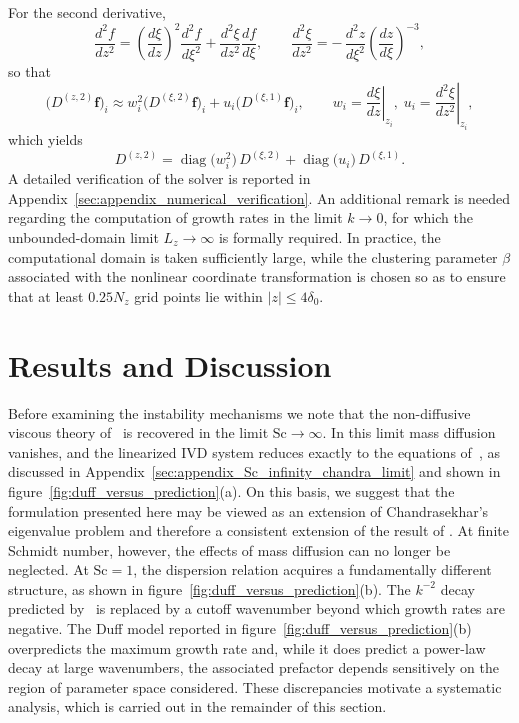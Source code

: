 \documentclass[11pt]{article}
\newcommand{\Sch}{\mathrm{Sc}}
\begin{document}
For the second derivative,
\begin{equation}
    \frac{d^{2}f}{dz^{2}} = \left(\frac{d\xi}{dz}\right)^{2}\frac{d^{2}f}{d\xi^{2}} + \frac{d^{2}\xi}{dz^{2}}\frac{df}{d\xi}, \qquad
    \frac{d^{2}\xi}{dz^{2}} = -\,\frac{d^{2}z}{d\xi^{2}}\left(\frac{dz}{d\xi}\right)^{-3},
\end{equation}
so that
\begin{equation}
    \bigl(D^{(z,2)}\mathbf{f}\bigr)_{i} \approx w_{i}^{2}\bigl(D^{(\xi,2)}\mathbf{f}\bigr)_{i} + u_{i}\bigl(D^{(\xi,1)}\mathbf{f}\bigr)_{i}, \qquad
    w_{i} = \left.\frac{d\xi}{dz}\right|_{z_{i}}, \; u_{i} = \left.\frac{d^{2}\xi}{dz^{2}}\right|_{z_{i}},
\end{equation}
which yields
\begin{equation}
    D^{(z,2)} = \operatorname{diag}\!\bigl(w_{i}^{2}\bigr)\,D^{(\xi,2)} + \operatorname{diag}\!\bigl(u_{i}\bigr)\,D^{(\xi,1)}.
\end{equation}
A detailed verification of the solver is reported in Appendix~\ref{sec:appendix_numerical_verification}. An additional remark is needed regarding the computation of growth rates in the limit \(k \to 0\), for which the unbounded-domain limit \(L_z \to \infty\) is formally required. In practice, the computational domain is taken sufficiently large, while the clustering parameter \(\beta\) associated with the nonlinear coordinate transformation is chosen so as to ensure that at least \(0.25N_z\) grid points lie within \(|z|\leq 4\delta_0\).



\section{Results and Discussion}%
\label{sec:result_and_discussion}
Before examining the instability mechanisms we note that the non-diffusive viscous theory of~\citet{chandrasekhar-1961} is recovered in the limit \(\Sch \to \infty\). In this limit mass diffusion vanishes, and the linearized IVD system reduces exactly to the equations of~\citet{chandrasekhar-1961}, as discussed in Appendix~\ref{sec:appendix_Sc_infinity_chandra_limit} and shown in figure~\ref{fig:duff_versus_prediction}(a). On this basis, we suggest that the formulation presented here may be viewed as an extension of Chandrasekhar's eigenvalue problem and therefore a consistent extension of the result of \citet{morgan-likhachev-jacobs-2016}. At finite Schmidt number, however, the effects of mass diffusion can no longer be neglected. At \(\Sch = 1\), the dispersion relation acquires a fundamentally different structure, as shown in figure~\ref{fig:duff_versus_prediction}(b). The \(k^{-2}\) decay predicted by~\citet{morgan-likhachev-jacobs-2016} is replaced by a cutoff wavenumber beyond which growth rates are negative. The Duff model reported in figure~\ref{fig:duff_versus_prediction}(b) overpredicts the maximum growth rate and, while it does predict a power-law decay at large wavenumbers, the associated prefactor depends sensitively on the region of parameter space considered. These discrepancies motivate a systematic analysis, which is carried out in the remainder of this section.
\end{document}
